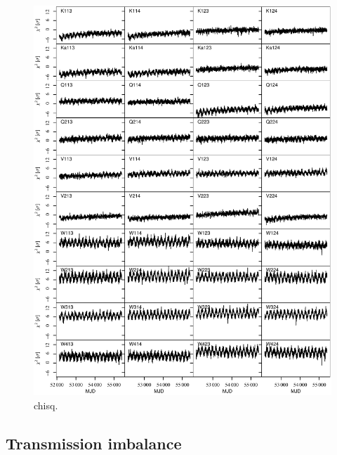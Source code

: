 \documentclass[twocolumn]{../../common/aa}
\begin{document}
\begin{figure}[p]
  	\centering
	\includegraphics[width=\textwidth]{figures/instpar_CG_chisq_v1.pdf}
	\caption{chisq.}
	\label{fig:chisq}
\end{figure}


\subsection{Transmission imbalance}
\end{document}
